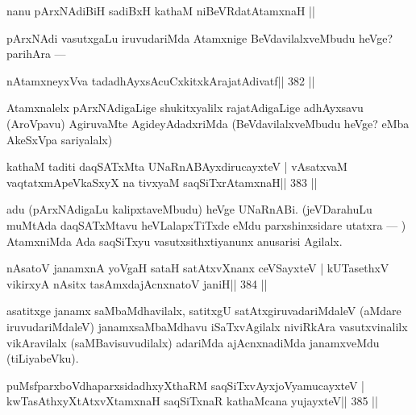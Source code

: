 
\begin{shl}
nanu pArxNAdiBiH sadiBxH kathaM niBeVRdatA\s\s tamxnaH ||
\end{shl}

\begin{artha}
pArxNAdi vasutxgaLu iruvudariMda Atamxnige BeVdavilalxveMbudu heVge? parihAra  {\rm ---} 
\end{artha}

\begin{shl}
nA\s\s tamxneyxVva tadadhAyxsAcuCxkitxkArajatAdivatf\hfill || 382 ||
\end{shl}

\begin{artha}
Atamxnalelx pArxNAdigaLige shukitxyalilx rajatAdigaLige adhAyxsavu (AroVpavu) AgiruvaMte AgideyAdadxriMda (BeVdavilalxveMbudu heVge? eMba AkeSxVpa sariyalalx)
\end{artha}

\begin{shl}
kathaM taditi daqSATxMta UNaRnABAyxdirucayxteV |
vAsatxvaM vaqtatxmApeVkaSxyX na tivxyaM saqSiTxrAtamxnaH\hfill || 383 ||
\end{shl}

\begin{artha}
adu (pArxNAdigaLu kalipxtaveMbudu) heVge UNaRnABi. (jeVDarahuLu muMtAda  daqSATxMtavu heVLalapxTiTxde eMdu parxshinxsidare utatxra  {\rm ---} ) AtamxniMda Ada saqSiTxyu vasutxsithxtiyanunx anusarisi Agilalx.
\end{artha}


\begin{shl}
nAsatoV janamxnA yoVgaH sataH satAtxvXnanx ceVSayxteV |
kUTasethxV vikirxyA nAsitx tasAmxdajAcnxnatoV janiH\hfill || 384 ||
\end{shl}

\begin{artha}
asatitxge janamx saMbaMdhavilalx, satitxgU satAtxgiruvadariMdaleV 
(aMdare iruvudariMdaleV) janamxsaMbaMdhavu iSaTxvAgilalx niviRkAra vasutxvinalilx vikAravilalx (saMBavisuvudilalx) adariMda ajAcnxnadiMda janamxveMdu (tiLiyabeVku).
\end{artha}

\begin{shl}
puMsfparxboVdhaparxsidadhxyXthaRM saqSiTxvAyxjoV\s yamucayxteV |
kwTasAthxyXtAtxvXtamxnaH saqSiTxnaR kathaMcana yujayxteV\hfill || 385 ||
\end{shl}

